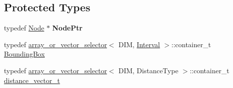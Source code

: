 \subsection*{Protected Types}
\begin{DoxyCompactItemize}
\item 
\hypertarget{classSph_1_1KDTreeSingleIndexAdaptor_a2916c59e8cd4645f22923be1286609c7}{}\label{classSph_1_1KDTreeSingleIndexAdaptor_a2916c59e8cd4645f22923be1286609c7} 
typedef \hyperlink{structSph_1_1KDTreeSingleIndexAdaptor_1_1Node}{Node} $\ast$ {\bfseries Node\+Ptr}
\item 
typedef \hyperlink{structSph_1_1array__or__vector__selector}{array\+\_\+or\+\_\+vector\+\_\+selector}$<$ D\+IM, \hyperlink{structSph_1_1KDTreeSingleIndexAdaptor_1_1Interval}{Interval} $>$\+::container\+\_\+t \hyperlink{classSph_1_1KDTreeSingleIndexAdaptor_aaf4a44f184e81388817dbffb5771f186}{Bounding\+Box}
\item 
typedef \hyperlink{structSph_1_1array__or__vector__selector}{array\+\_\+or\+\_\+vector\+\_\+selector}$<$ D\+IM, Distance\+Type $>$\+::container\+\_\+t \hyperlink{classSph_1_1KDTreeSingleIndexAdaptor_a662e739c535b91fc6a837595f00d28cb}{distance\+\_\+vector\+\_\+t}
\end{DoxyCompactItemize}
